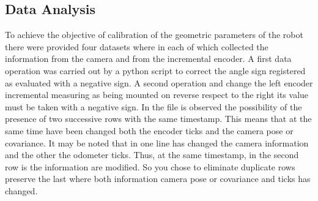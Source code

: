 \subsection{Data Analysis}
To achieve the objective of calibration of the geometric parameters of the robot there were provided four datasets where in each of which collected the information from the camera and from the incremental encoder.
A first data operation was carried out by a python script to correct the angle sign registered as evaluated with a negative sign.
A second operation and change the left encoder incremental measuring as being mounted on reverse respect to the right its value must be taken with a negative sign.
In the file is observed
the possibility of the presence of two successive rows with the same timestamp. This means that at the same time have been changed both the encoder ticks and the camera pose or covariance.
It may be noted that in one line has changed the camera information and the other the odometer ticks. Thus, at the same timestamp, in the second row is the information are modified.
So you chose to eliminate duplicate rows preserve the last where both information camera pose or covariance and ticks has changed.